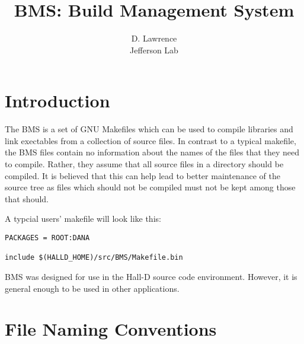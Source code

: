 \documentclass[12pt]{article}
\author{D. Lawrence \\ Jefferson Lab}
\title{BMS: Build Management System}
\begin{document}
\maketitle



\newpage
\tableofcontents
\newpage

\section{Introduction}
The BMS is a set of GNU Makefiles which can be used to compile libraries
and link exectables from a collection of source files. In contrast
to a typical makefile, the BMS files contain no information about the
names of the files that they need to compile. Rather, they assume that all
source files in a directory should be compiled. It is believed that this can help 
lead to better maintenance of the source tree as files which should not be
compiled must not be kept among those that should.

A typcial users'
makefile will look like this:

\begin{lstlisting}[caption={Example Makefile},label=example
,frame=shadowbox,backgroundcolor=\color{codebkgd}]
PACKAGES = ROOT:DANA

include $(HALLD_HOME)/src/BMS/Makefile.bin
\end{lstlisting}

BMS was designed for use in the Hall-D source code environment. However,
it is general enough to be used in other applications. 

\section{File Naming Conventions}
\end{document}
